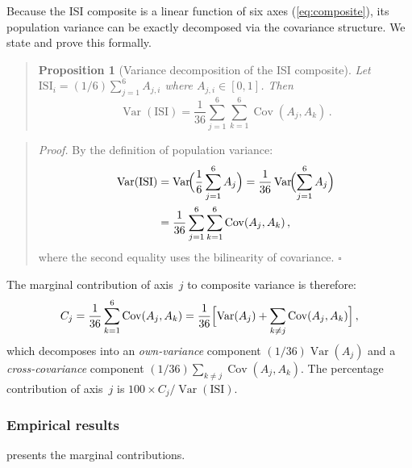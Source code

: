 Because the ISI composite is a linear function of six axes
(\cref{eq:composite}), its population variance can be exactly
decomposed via the covariance structure.  We state and prove this
formally.

\begin{quote}\begin{sloppypar}
\textbf{Proposition 1} (Variance decomposition of the ISI composite).
\textit{Let $\mathrm{ISI}_i = (1/6)\sum_{j=1}^{6} A_{j,i}$ where
$A_{j,i} \in [0,1]$.  Then}
\begin{equation}\label{eq:var-decomp}
  \operatorname{Var}(\mathrm{ISI})
  = \frac{1}{36}\sum_{j=1}^{6}\sum_{k=1}^{6}
    \operatorname{Cov}(A_j, A_k)\,.
\end{equation}
\end{sloppypar}\end{quote}

\begin{quote}
\textit{Proof.}  By the definition of population variance:
\begin{align}
  \operatorname{Var}(\mathrm{ISI})
  &= \operatorname{Var}\!\Bigl(\frac{1}{6}\sum_{j=1}^{6} A_j\Bigr)
   = \frac{1}{36}\operatorname{Var}\!\Bigl(\sum_{j=1}^{6} A_j\Bigr)
   \notag \\
  &= \frac{1}{36}\sum_{j=1}^{6}\sum_{k=1}^{6}
     \operatorname{Cov}(A_j, A_k)\,,
     \label{eq:var-decomp-proof}
\end{align}
where the second equality uses the bilinearity of covariance.
\hfill$\square$
\end{quote}

The marginal contribution of axis~$j$ to composite variance is
therefore:
\begin{equation}\label{eq:marginal-contrib}
  C_j
  = \frac{1}{36}\sum_{k=1}^{6}\operatorname{Cov}(A_j, A_k)
  = \frac{1}{36}\Bigl[\operatorname{Var}(A_j)
    + \sum_{k \neq j}\operatorname{Cov}(A_j, A_k)\Bigr]\,,
\end{equation}
which decomposes into an \emph{own-variance} component
$(1/36)\operatorname{Var}(A_j)$ and a \emph{cross-covariance}
component $(1/36)\sum_{k \neq j}\operatorname{Cov}(A_j, A_k)$.
The percentage contribution of axis~$j$ is $100 \times C_j /
\operatorname{Var}(\mathrm{ISI})$.

\subsubsection{Empirical results}

 presents the marginal contributions.

